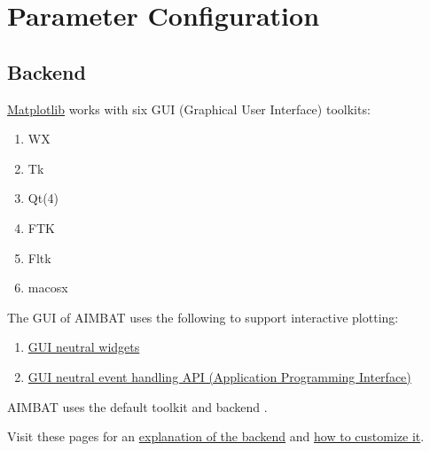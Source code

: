 \documentclass[letterpaper,10pt,english]{sphinxmanual}
\begin{document}
\chapter{Parameter Configuration}
\label{docfiles/parameterConfiguration:parameter-configuration}\label{docfiles/parameterConfiguration::doc}

\section{Backend}
\label{docfiles/parameterConfiguration:backend}
\href{http://matplotlib.org/contents.html}{Matplotlib} works with six GUI (Graphical User Interface) toolkits:
\begin{enumerate}
\item {} 
WX

\item {} 
Tk

\item {} 
Qt(4)

\item {} 
FTK

\item {} 
Fltk

\item {} 
macosx

\end{enumerate}

The GUI of AIMBAT uses the following to support interactive plotting:
\begin{enumerate}
\item {} 
\href{http://matplotlib.org/api/widgets\_api.html}{GUI neutral widgets}

\item {} 
\href{http://matplotlib.org/users/event\_handling.html}{GUI neutral event handling API (Application Programming Interface)}

\end{enumerate}

AIMBAT uses the default toolkit  and backend .

Visit these pages for an \href{http://matplotlib.org/faq/usage\_faq.html\#what-is-a-backend}{explanation of the backend} and \href{http://matplotlib.org/users/customizing.html\#customizing-matplotlib}{how to customize it}.
\end{document}
